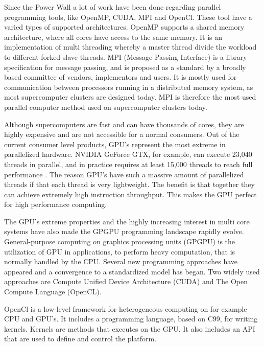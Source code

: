 Since the Power Wall a lot of work have been done regarding parallel programming tools, like OpenMP, CUDA, MPI and OpenCl. These tool have a varied types of supported architectures. OpenMP supports a shared memory architecture, where all cores have access to the same memory. It is an implementation of multi threading whereby a master thread divide the workload to different forked slave threads. MPI (Message Passing Interface) is a library specification for message passing, and is proposed as a standard by a broadly based committee of vendors, implementors and users. It is mostly used for communication between processors running in a distributed memory system, as most supercomputer clusters are designed today. MPI is therefore the most used parallel computer method used on supercomputer clusters today.


Although supercomputers are fast and can have thousands of cores, they are highly expensive and are not accessible for a normal consumers. Out of the current consumer level products, GPU's represent the most extreme in parallelized hardware. NVIDIA GeForce GTX, for example, can execute 23,040 threads in parallel, and in practice requires at least 15,000 threads to reach full performance \citep{karras2012}. The reason GPU's have such a massive amount of parallelized threads if that each thread is very lightweight. The benefit is that together they can achieve extremely high instruction throughput. This makes the GPU perfect for high performance computing.


The GPU's extreme properties and the highly increasing interest in multi core systems have also made the GPGPU programming landscape rapidly evolve. General-purpose computing on graphics processing units (GPGPU) is the utilization of GPU in applications, to perform heavy computation, that is normally handled by the CPU. Several new programming approaches have appeared and a convergence to a standardized model has began. Two widely used approaches are Compute Unified Device Architecture (CUDA) and The Open Compute Language (OpenCL).


OpenCl is a low-level framework for heterogeneous computing on for example CPU and GPU's. It includes a programming language, based on C99, for writing kernels. Kernels are methods that executes on the GPU. It also includes an API that are used to define and control the platform.

